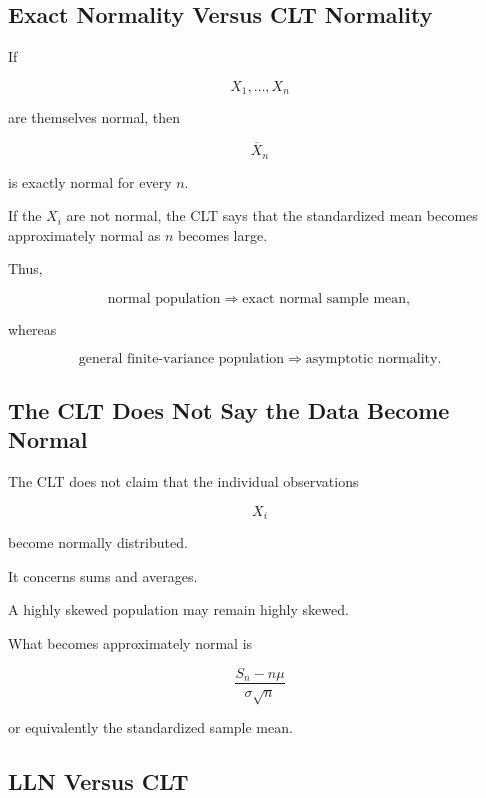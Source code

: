\subsection{Exact Normality Versus CLT Normality}
\label{subsec:exact-versus-asymptotic-normality}

If

\[
X_1,\ldots,X_n
\]

are themselves normal, then

\[
\overline{X}_n
\]

is exactly normal for every \(n\).

If the \(X_i\) are not normal, the CLT says that the standardized mean
becomes approximately normal as \(n\) becomes large.

Thus,

\[
\boxed{
\text{normal population}
\Longrightarrow
\text{exact normal sample mean},
}
\]

whereas

\[
\boxed{
\text{general finite-variance population}
\Longrightarrow
\text{asymptotic normality}.
}
\]

\subsection{The CLT Does Not Say the Data Become Normal}
\label{subsec:clt-data-not-normal}

The CLT does not claim that the individual observations

\[
X_i
\]

become normally distributed.

It concerns sums and averages.

A highly skewed population may remain highly skewed.

What becomes approximately normal is

\[
\boxed{
\frac{
S_n-n\mu
}{
\sigma\sqrt{n}
}
}
\]

or equivalently the standardized sample mean.

\subsection{LLN Versus CLT}
\label{subsec:clt-versus-lln}

